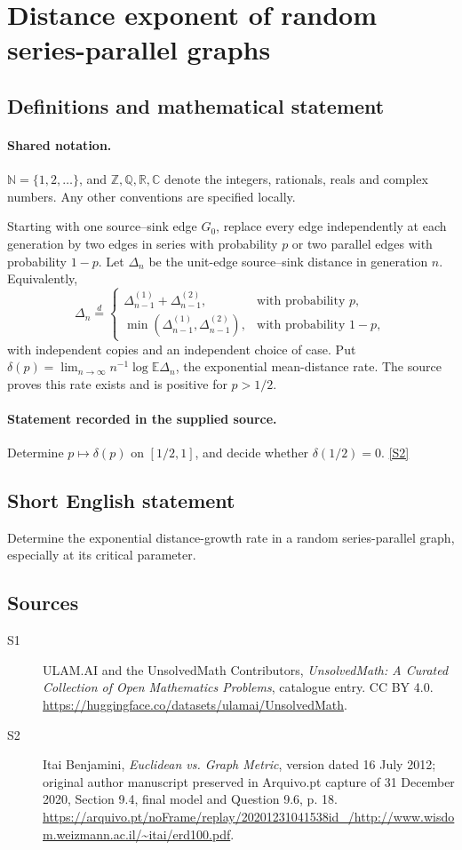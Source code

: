\documentclass[11pt]{article}
\newcommand{\sref}[2]{\hyperlink{source:#1:#2}{[S#2]}}
\begin{document}
\section{Distance exponent of random series-parallel graphs}\label{statement}

\subsection{Definitions and mathematical statement}

\paragraph{Shared notation.}$\mathbb N=\{1,2,\ldots\}$, and $\mathbb Z,\mathbb Q,\mathbb R,\mathbb C$ denote the integers, rationals, reals and complex numbers. Any other conventions are specified locally.


Starting with one source--sink edge $G_0$, replace every edge independently at each generation by two edges in series with probability $p$ or two parallel edges with probability $1-p$. Let $\Delta_n$ be the unit-edge source--sink distance in generation $n$. Equivalently,
\[\Delta_n\stackrel d=\begin{cases}\Delta_{n-1}^{(1)}+\Delta_{n-1}^{(2)},&\text{with probability }p,\\\min(\Delta_{n-1}^{(1)},\Delta_{n-1}^{(2)}),&\text{with probability }1-p,\end{cases}\]
with independent copies and an independent choice of case. Put $\delta(p)=\lim_{n\to\infty}n^{-1}\log\mathbb E\Delta_n$, the exponential mean-distance rate. The source proves this rate exists and is positive for $p>1/2$.
\paragraph{Statement recorded in the supplied source.}
Determine $p\mapsto\delta(p)$ on $[1/2,1]$, and decide whether $\delta(1/2)=0$. \sref{statement}{2}
\subsection{Short English statement}
Determine the exponential distance-growth rate in a random series-parallel graph, especially at its critical parameter.
\subsection{Sources}
\begin{description}
\item[\hypertarget{source:statement:1}{S1}] ULAM.AI and the UnsolvedMath Contributors, \emph{UnsolvedMath: A Curated Collection of Open Mathematics Problems}, catalogue entry. CC BY 4.0. \url{https://huggingface.co/datasets/ulamai/UnsolvedMath}.
\item[\hypertarget{source:statement:2}{S2}] Itai Benjamini, \emph{Euclidean vs. Graph Metric}, version dated 16 July 2012; original author manuscript preserved in Arquivo.pt capture of 31 December 2020, Section 9.4, final model and Question 9.6, p. 18. \url{https://arquivo.pt/noFrame/replay/20201231041538id_/http://www.wisdom.weizmann.ac.il/~itai/erd100.pdf}.
\end{description}
\label{end:statement}
\end{document}
